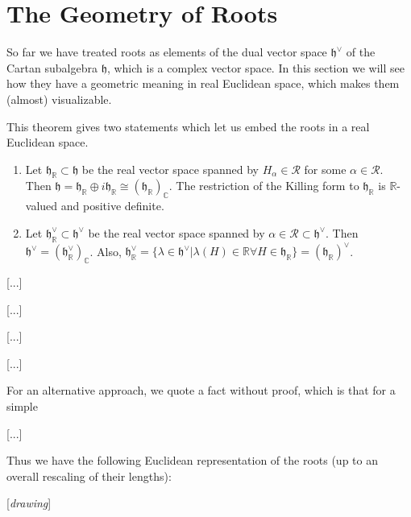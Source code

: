 \section{The Geometry of Roots}

So far we have treated roots as elements of the dual vector space \(\mathfrak{h}^{\vee}\) of the Cartan subalgebra \(\mathfrak{h}\), which is a complex vector space. In this section we will see how they have a geometric meaning in real Euclidean space, which makes them (almost) visualizable.

\begin{theorem}
    This theorem gives two statements which let us embed the roots in a real Euclidean space.
    \begin{enumerate}
        \item Let \(\mathfrak{h}_\mathbb{R} \subset \mathfrak{h}\) be the real vector space spanned by \(H_\alpha \in \mathcal{R}\) for some \(\alpha \in \mathcal{R}\). Then \(\mathfrak{h} = \mathfrak{h}_\mathbb{R} \oplus i\mathfrak{h}_\mathbb{R} \cong (\mathfrak{h}_\mathbb{R})_\mathbb{C}\). The restriction of the Killing form to \(\mathfrak{h}_\mathbb{R}\) is \(\mathbb{R}\)-valued and positive definite.
        \item Let \(\mathfrak{h}^{\vee}_\mathbb{R} \subset \mathfrak{h}^{\vee}\) be the real vector space spanned by \(\alpha \in \mathcal{R} \subset \mathfrak{h}^{\vee}\). Then \(\mathfrak{h}^{\vee} = (\mathfrak{h}^{\vee}_\mathbb{R})_\mathbb{C}\). Also, \(\mathfrak{h}^{\vee}_\mathbb{R} = \{\lambda \in \mathfrak{h}^{\vee} | \lambda(H) \in \mathbb{R} \forall H \in \mathfrak{h}_\mathbb{R}\} = (\mathfrak{h}_\mathbb{R})^{\vee}\).
    \end{enumerate}
\end{theorem}

[...]

[...]

\begin{example}[\(\mathfrak{g} = \mathfrak{sl}(2, \mathbb{C})\)]
    [...]

    [...]

\end{example}

\begin{example}[\(\mathfrak{g} = \mathfrak{sl}(3, \mathbb{C})= \mathfrak{su}(3)_\mathbb{C}\)]

    [...]

    For an alternative approach, we quote a fact without proof, which is that for a simple

        [...]

    Thus we have the following Euclidean representation of the roots (up to an overall rescaling of their lengths):

    [\textit{drawing}]

\end{example}

